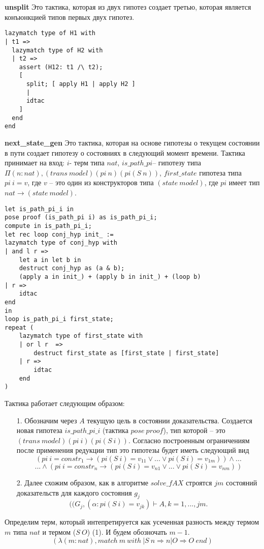 \documentclass[12pt]{article}
\begin{document}
\textbf{unsplit}
Это тактика, которая из двух гипотез создает третью, которая является конъюнкцией типов первых двух гипотез.
\begin{verbatim}
lazymatch type of H1 with
| t1 => 
  lazymatch type of H2 with 
  | t2 => 
    assert (H12: t1 /\ t2);
    [
      split; [ apply H1 | apply H2 ]
      | 
      idtac
    ]
  end
end
\end{verbatim}

\textbf{next\_state\_gen} 
Это тактика, которая на основе гипотезы о текущем состоянии в пути создает гипотезу о состояниях в следующий момент времени.
Тактика принимает на вход: $i$- терм типа $nat$, $is\_path\_pi$-- гипотезу типа $\Pi (n : nat), (trans\ model) (pi\ n) (pi (S\ n))$, $first\_state$ гипотеза типа $pi\ i = v$, где $v$ -- это один из конструкторов типа $(state\ model)$, где $pi$ имеет тип $nat \xrightarrow{} (state\ model)$.


\begin{verbatim}
let is_path_pi_i in
pose proof (is_path_pi i) as is_path_pi_i;
compute in is_path_pi_i;
let rec loop conj_hyp init_ :=
lazymatch type of conj_hyp with
| and l r => 
    let a in let b in
    destruct conj_hyp as (a & b);
    (apply a in init_) + (apply b in init_) + (loop b)
| r => 
    idtac
end
in
loop is_path_pi_i first_state;
repeat (
    lazymatch type of first_state with
    | or l r  =>
        destruct first_state as [first_state | first_state]
    | r => 
        idtac
    end
)
\end{verbatim}



Тактика работает следующим образом:
\begin{enumerate}
\item[1.] Обозначим через $A$ текущую цель в состоянии доказательства. Создается новая гипотеза $is\_path\_pi\_i$ (тактика $pose\ proof$), тип которой -- это $(trans\ model) (pi\ i) (pi (S\ i))$. Согласно построенным ограничениям после применения редукции тип это гипотезы
будет иметь следующий вид
$$(pi\ i = constr_1 \xrightarrow{} (pi (S\ i)=v_{11} \vee ... \vee pi (S\ i)=v_{1m})) \wedge ... $$
$$... \wedge (pi\ i = constr_n \xrightarrow{} (pi (S\ i)=v_{n1} \vee ... \vee pi (S\ i)=v_{nm}))$$
\item[2.] Далее схожим образом, как в алгоритме $solve\_fAX$ строятся $jm$ состояний доказательств для каждого состояния $g_j$
$$((G_j, (\alpha: pi (S\ i)=v_{jk}) \vdash A, k=1,...,jm.$$
\end{enumerate}

Определим терм, который интепретируется как усеченная разность между термом $m$ типа $nat$ и термом ($S\ O$) (1). И будем обозночать $m - 1$.
$$(\lambda (m:nat), match\ m\ with\ | S\ n \Rightarrow n | O \Rightarrow O\ end)$$
\end{document}
